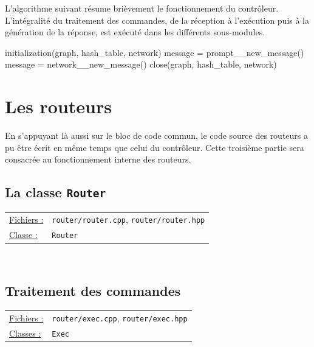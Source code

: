 \documentclass[a4paper,11pt]{article}
\begin{document}
L'algorithme suivant résume brièvement le fonctionnement du contrôleur. L'intégralité du traitement des commandes, de la réception à l'exécution puis à la génération de la réponse, est exécuté dans les différents sous-modules.

\begin{algorithm}[H]
 initialization(graph, hash\_table, network)\;
  {
 	message = prompt\_\_new\_message()\;
 	\BlankLine
 	message = network\_\_new\_message()\;
 	\BlankLine
 }
 close(graph, hash\_table, network)\;
\end{algorithm}

\section{Les routeurs} %

En s'appuyant là aussi sur le bloc de code commun, le code source des routeurs a pu être écrit en même temps que celui du contrôleur. Cette troisième partie sera consacrée au fonctionnement interne des routeurs.

\subsection{La classe \texttt{Router}} %

\begin{tabularx}{\linewidth}{lX}
\underline{Fichiers :} & \texttt{router/router.cpp}, \texttt{router/router.hpp}\\
\underline{Classe :} & \texttt{Router}\\
\end{tabularx}\\

\subsection{Traitement des commandes} %

\begin{tabularx}{\linewidth}{lX}
\underline{Fichiers :} & \texttt{router/exec.cpp}, \texttt{router/exec.hpp}\\
\underline{Classes :} & \texttt{Exec}\\
\end{tabularx}\\
\end{document}
